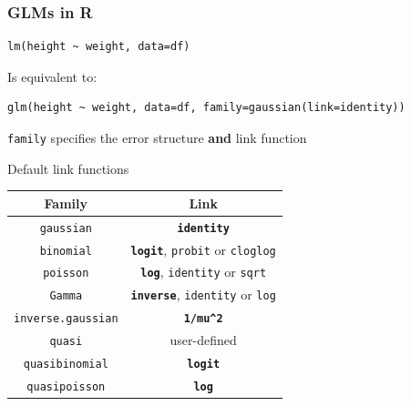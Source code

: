 \documentclass[pdf]{beamer}
\begin{document}
\begin{frame}[fragile]
\frametitle{GLMs in R}


\begin{lstlisting}[style=R]
lm(height ~ weight, data=df)
\end{lstlisting}


Is equivalent to:
\vfill

\begin{lstlisting}[style=R]
glm(height ~ weight, data=df, family=gaussian(link=identity))
\end{lstlisting}

\vfill

\texttt{family} specifies the error structure \textbf{and} link function

\end{frame}

\begin{frame}{Default link functions}

\begin{longtable}[]{c|c}
\textbf{Family} & \textbf{Link}\tabularnewline\hline
\texttt{gaussian} & \textbf{\texttt{identity}}\tabularnewline
\texttt{binomial} & \textbf{\texttt{logit}}, \texttt{probit} or
\texttt{cloglog}\tabularnewline
\texttt{poisson} & \textbf{\texttt{log}}, \texttt{identity} or
\texttt{sqrt}\tabularnewline
\texttt{Gamma} & \textbf{\texttt{inverse}}, \texttt{identity} or
\texttt{log}\tabularnewline
\texttt{inverse.gaussian} & \textbf{\texttt{1/mu\^{}2}}\tabularnewline
\texttt{quasi} & user-defined\tabularnewline
\texttt{quasibinomial} & \textbf{\texttt{logit}}\tabularnewline
\texttt{quasipoisson} & \textbf{\texttt{log}}\tabularnewline
\end{longtable}

\end{frame}
\end{document}
